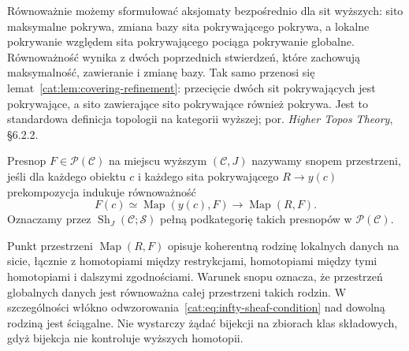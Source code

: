 Równoważnie możemy sformułować aksjomaty bezpośrednio dla sit wyższych: sito maksymalne pokrywa, zmiana bazy sita pokrywającego pokrywa, a lokalne pokrywanie względem sita pokrywającego pociąga pokrywanie globalne. Równoważność wynika z dwóch poprzednich stwierdzeń, które zachowują maksymalność, zawieranie i zmianę bazy. Tak samo przenosi się lemat~\ref{cat:lem:covering-refinement}: przecięcie dwóch sit pokrywających jest pokrywające, a sito zawierające sito pokrywające również pokrywa. Jest to standardowa definicja topologii na kategorii wyższej; por. \emph{Higher Topos Theory}, \S6.2.2.

\begin{definicja}\label{cat:def:infty-space-sheaf}
Presnop $F\in\mathcal P(\mathcal C)$ na miejscu wyższym $(\mathcal C,J)$ nazywamy snopem przestrzeni, jeśli dla każdego obiektu $c$ i każdego sita pokrywającego $R\to y(c)$ prekompozycja indukuje równoważność
\begin{equation}\label{cat:eq:infty-sheaf-condition}
 F(c)\simeq\operatorname{Map}(y(c),F)
 \longrightarrow\operatorname{Map}(R,F).
\end{equation}
Oznaczamy przez $\operatorname{Sh}_J(\mathcal C;\mathcal S)$ pełną podkategorię takich presnopów w $\mathcal P(\mathcal C)$.
\end{definicja}

Punkt przestrzeni $\operatorname{Map}(R,F)$ opisuje koherentną rodzinę lokalnych danych na sicie, łącznie z homotopiami między restrykcjami, homotopiami między tymi homotopiami i dalszymi zgodnościami. Warunek snopu oznacza, że przestrzeń globalnych danych jest równoważna całej przestrzeni takich rodzin. W szczególności włókno odwzorowania~\eqref{cat:eq:infty-sheaf-condition} nad dowolną rodziną jest ściągalne. Nie wystarczy żądać bijekcji na zbiorach klas składowych, gdyż bijekcja nie kontroluje wyższych homotopii.

